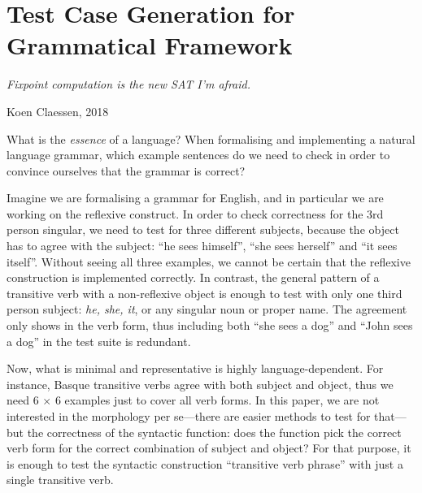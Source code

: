 \def\t#1{\texttt{#1}}
\def\gf{\textsc{gf}}
\def\pgf{\textsc{pgf}}
\def\lfg{\textsc{lfg}}
\def\ccg{\textsc{ccg}}
\def\tag{\textsc{tag}}
\def\cfg{\textsc{cfg}}
\def\pmcfg{\textsc{pmcfg}}
\def\hpsg{\textsc{hpsg}}
\def\feat{\textsc{feat}}
\newcommand{\tts}[1]{{\tt #1}}

\chapter{Test Case Generation for Grammatical Framework}
\label{chapterGFtest}

\epigraph{\it Fixpoint computation is the new SAT I'm afraid.}{Koen
  Claessen, 2018}

\noindent What is the \emph{essence} of a language? When formalising
and implementing a natural language grammar, which example sentences
do we need to check in order to convince ourselves that the grammar is
correct? 

Imagine we are formalising a grammar for English, and in particular we
are working on the reflexive construct. In order to check correctness
for the 3rd person singular, we need to test for three different
subjects, because the object has to agree with the subject: ``he sees
himself'', ``she sees herself'' and ``it sees itself''. Without seeing
all three examples, we cannot be certain that the reflexive
construction is implemented correctly. In contrast, the general
pattern of a transitive verb with a non-reflexive object is enough to
test with only one third person subject: \emph{he, she, it}, or any
singular noun or proper name. The agreement only shows in the verb
form, thus including both ``she sees a dog'' and ``John sees a dog''
in the test suite is redundant.  

Now, what is minimal and representative is highly language-dependent. 
For instance, Basque transitive verbs agree with both subject and
object, thus we need 6 $\times$ 6 examples just to cover all verb
forms. In this paper, we are not interested in the morphology per se---there are
easier methods to test for that---but the correctness of the syntactic
function: does the function pick the correct verb form for the correct
combination of subject and object? For that purpose, it is enough to
test the syntactic construction ``transitive verb phrase'' with just a
single transitive verb.

